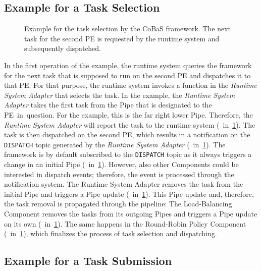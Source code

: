 \subsection{Example for a Task Selection}%
\label{sec:arch:example:step1}

\begin{figure}[b!] \centering
	\caption[Example for the task selection by the CoBaS framework.]{Example for the task selection by the CoBaS framework. The next task for the second PE is requested by the runtime system and subsequently dispatched.}%
	\label{fig:arch:example:step1}
\end{figure}

In the first operation of the example, the runtime system queries the \cobas{} framework for the next task that is supposed to run on the second \ac{PE} and dispatches it to that \ac{PE}. For that purpose, the runtime system invokes a function in the \emph{Runtime System Adapter} that selects the task. In the example, the \emph{Runtime System Adapter} takes the first task from the Pipe that is designated to the \ac{PE}~in~question. For the example, this is the far right lower Pipe. Therefore, the \emph{Runtime System Adapter} will report the  task to the runtime system (~in~\cref{fig:arch:example:step1}). The  task is then dispatched on the second \ac{PE}, which results in a notification on the \texttt{DISPATCH} topic generated by the \emph{Runtime System Adapter} (~in~\cref{fig:arch:example:step1}). The framework is by default subscribed to the \texttt{DISPATCH} topic as it always triggers a change in an initial Pipe (~in~\cref{fig:arch:example:step1}). However, also other Components could be interested in dispatch events; therefore, the event is processed through the \cobas{} notification system. The Runtime System Adapter removes the task from the initial Pipe and triggers a Pipe update (~in~\cref{fig:arch:example:step1}). This Pipe update and, therefore, the task removal is propagated through the pipeline: The Load-Balancing Component removes the tasks from its outgoing Pipes and triggers a Pipe update on its own (~in~\cref{fig:arch:example:step1}). The same happens in the Round-Robin Policy Component (~in~\cref{fig:arch:example:step1}), which finalizes the process of task selection and dispatching.

\subsection{Example for a Task Submission}%
\label{sec:arch:example:step2}

